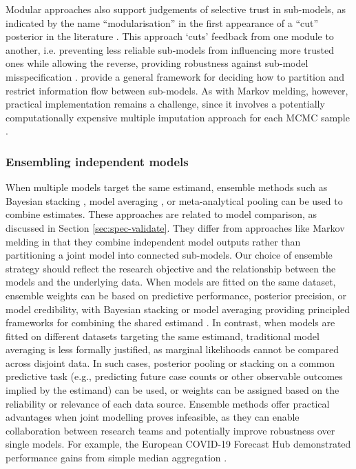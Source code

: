 \documentclass{article}
\begin{document}
Modular approaches also support judgements of selective trust in sub-models, as indicated by the name ``modularisation'' in the first appearance of a ``cut'' posterior in the literature \citep{LiuEtAl2009}. This approach `cuts' feedback from one module to another, i.e. preventing less reliable sub-models from influencing more trusted ones while allowing the reverse, providing robustness against sub-model misspecification \citep{plummer2015cuts,carmona2022scalable,yu2023variational}. \citet{liu2025general} provide a general framework for deciding how to partition and restrict information flow between sub-models. As with Markov melding, however, practical implementation remains a challenge, since it involves a potentially computationally expensive multiple imputation approach for each MCMC sample \citep{plummer2015cuts}.

\subsubsection{Ensembling independent models}\label{sec:ensembling}

When multiple models target the same estimand, ensemble methods such as Bayesian stacking \citep{yao2018using}, model averaging \citep{hoeting1999bayesian}, or meta-analytical pooling \citep{jackson2011multivariate} can be used to combine estimates.
These approaches are related to model comparison, as discussed in Section \ref{sec:spec-validate}.
They differ from approaches like Markov melding in that they combine independent model outputs rather than partitioning a joint model into connected sub-models. Our choice of ensemble strategy should reflect the research objective and the relationship between the models and the underlying data. When models are fitted on the same dataset, ensemble weights can be based on predictive performance, posterior precision, or model credibility, with Bayesian stacking or model averaging providing principled frameworks for combining the shared estimand \citep{yao2018using}. In contrast, when models are fitted on different datasets targeting the same estimand, traditional model averaging is less formally justified, as marginal likelihoods cannot be compared across disjoint data. In such cases, posterior pooling or stacking on a common predictive task (e.g., predicting future case counts or other observable outcomes implied by the estimand) can be used, or weights can be assigned based on the reliability or relevance of each data source. Ensemble methods offer practical advantages when joint modelling proves infeasible, as they can enable collaboration between research teams and potentially improve robustness over single models.
For example, the European COVID-19 Forecast Hub demonstrated performance gains from simple median aggregation \citep{sherratt2021exploring}. 
\end{document}
